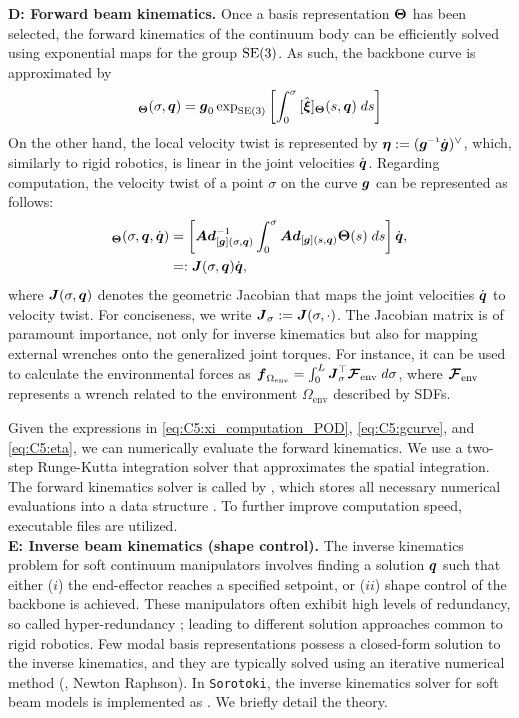 \textbf{D: Forward beam kinematics.} Once a basis representation ${\boldsymbol{\Theta}}$ has been selected, the forward kinematics of the continuum body can be efficiently solved using exponential maps for the group $\textup{\textrm{SE}}(3)$. As such, the backbone curve is approximated by
%
\begin{equation}
    [\gB]_{\ThetaB}(\sigma,\q) = \gB_0 \exp_{\textrm{SE}(3)} \left[ \int_0^\sigma {[\hat{\xiB}]_\ThetaB}(s,\q) \; ds\right]
    \label{eq:C5:gcurve}
\end{equation}
%
On the other hand, the local velocity twist is represented by $\etaB:= (\gB\inv\dot{\gB})^{\vee}$, which, similarly to rigid robotics, is linear in the joint velocities $\dot{{\boldsymbol{q}}}$. Regarding computation, the velocity twist of a point $\sigma$ on the curve ${\boldsymbol{g}}$ can be represented as follows:
%
\begin{align}
    [\etaB]_\ThetaB(\sigma,\q,\dq) & = \left[\mat{Ad}^{-1}_{[\gB](\sigma,\q)}\int_{0}^\sigma  \mat{Ad}_{[\gB](s,\q)} \ThetaB(s)\; ds \right]  \dq,  \notag \\
                                  & =: \JB(\sigma,\q) \dq,
                                  \label{eq:C5:eta}                                  
\end{align}
%
where ${\boldsymbol{J}}(\sigma,{\boldsymbol{q}})$ denotes the geometric Jacobian that maps the joint velocities ${\dot{\boldsymbol{q}}}$ to velocity twist. For conciseness, we write ${\boldsymbol{J}}_\sigma := {\boldsymbol{J}}(\sigma,\cdot)$. The Jacobian matrix is of paramount importance, not only for inverse kinematics but also for mapping external wrenches onto the generalized joint torques. For instance, it can be used to calculate the environmental forces as ${\boldsymbol{f}}_{\Omega_{\textrm{env}}} = \int_0^L {\boldsymbol{J}}_\sigma^\top {\boldsymbol{\mathcal{F}}}_{\textrm{env}} \; d\sigma$, where ${\boldsymbol{\mathcal{F}}}_{\textrm{env}}$ represents a wrench related to the environment $\Omega_{\textrm{env}}$ described by SDFs. 

Given the expressions in \eqref{eq:C5:xi_computation_POD}, \eqref{eq:C5:gcurve}, and \eqref{eq:C5:eta}, we can numerically evaluate the forward kinematics. We use a two-step Runge-Kutta integration solver that approximates the spatial integration. The forward kinematics solver is called by , which stores all necessary numerical evaluations into a data structure . To further improve computation speed,  executable files are utilized. \\[0.5em]

\textbf{E: Inverse beam kinematics (shape control).} \label{sec:C5:inverseKinematics} The inverse kinematics problem for soft continuum manipulators involves finding a solution ${\boldsymbol{q}}$ such that either ($i$) the end-effector reaches a specified setpoint, or ($ii$) shape control of the backbone is achieved. These manipulators often exhibit high levels of redundancy, so called hyper-redundancy \cite{Chirikjian1994Jun}; leading to different solution approaches common to rigid robotics. Few modal basis representations possess a closed-form solution to the inverse kinematics, and they are typically solved using an iterative numerical method (\eg, Newton Raphson). In \texttt{Sorotoki}, the inverse kinematics solver for soft beam models is implemented as . We briefly detail the theory.

